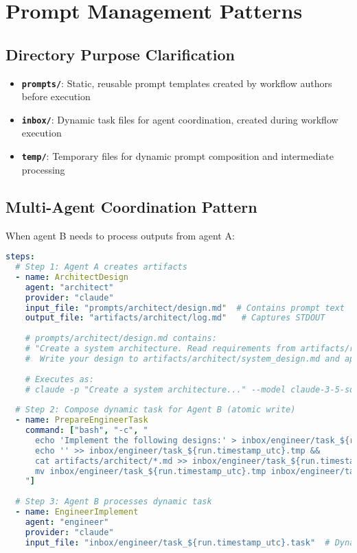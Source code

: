 \documentclass[11pt,a4paper]{article}
\begin{document}
\section{Prompt Management Patterns}

\subsection{Directory Purpose Clarification}

\begin{itemize}
    \item \textbf{\texttt{prompts/}}: Static, reusable prompt templates created by workflow authors before execution
    \item \textbf{\texttt{inbox/}}: Dynamic task files for agent coordination, created during workflow execution
    \item \textbf{\texttt{temp/}}: Temporary files for dynamic prompt composition and intermediate processing
\end{itemize}

\subsection{Multi-Agent Coordination Pattern}

When agent B needs to process outputs from agent A:

\begin{lstlisting}[language=yaml, caption={Multi-Agent Coordination Pattern}]
steps:
  # Step 1: Agent A creates artifacts
  - name: ArchitectDesign
    agent: "architect"
    provider: "claude"
    input_file: "prompts/architect/design.md"  # Contains prompt text
    output_file: "artifacts/architect/log.md"   # Captures STDOUT
    
    # prompts/architect/design.md contains:
    # "Create a system architecture. Read requirements from artifacts/requirements/*.md
    #  Write your design to artifacts/architect/system_design.md and api_spec.md"
    
    # Executes as:
    # claude -p "Create a system architecture..." --model claude-3-5-sonnet > artifacts/architect/log.md
    
  # Step 2: Compose dynamic task for Agent B (atomic write)
  - name: PrepareEngineerTask
    command: ["bash", "-c", "
      echo 'Implement the following designs:' > inbox/engineer/task_${run.timestamp_utc}.tmp &&
      echo '' >> inbox/engineer/task_${run.timestamp_utc}.tmp &&
      cat artifacts/architect/*.md >> inbox/engineer/task_${run.timestamp_utc}.tmp &&
      mv inbox/engineer/task_${run.timestamp_utc}.tmp inbox/engineer/task_${run.timestamp_utc}.task
    "]
    
  # Step 3: Agent B processes dynamic task
  - name: EngineerImplement
    agent: "engineer"
    provider: "claude"
    input_file: "inbox/engineer/task_${run.timestamp_utc}.task"  # Dynamically composed
\end{lstlisting}
\end{document}
